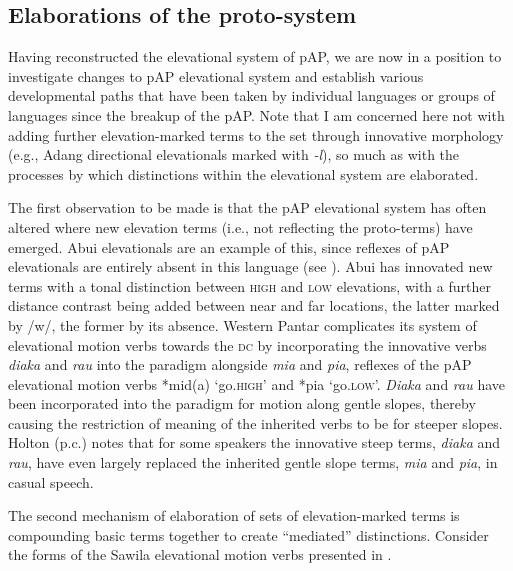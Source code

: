\subsection{Elaborations of the proto-system}\label{sec:7:4.3}
Having reconstructed the elevational system of pAP, we are now in a position to investigate changes to pAP elevational system and establish various developmental paths that have been taken by individual languages or groups of languages since the breakup of the pAP. Note that I am concerned here not with adding further elevation-marked terms to the set through innovative morphology (e.g., Adang directional elevationals marked with \textit{{}-}\textit{l}\textit{{\textepsilon}}), so much as with the processes by which distinctions within the elevational system are elaborated. 

The first observation to be made is that the pAP elevational system has often altered where new elevation terms (i.e., not reflecting the proto-terms) have emerged. Abui elevationals are an example of this, since reflexes of pAP elevationals are entirely absent in this language (see ). Abui has innovated new terms with a tonal distinction between \textsc{high} and \textsc{low} elevations, with a further distance contrast being added between near and far locations, the latter marked by /w/, the former by its absence. Western Pantar complicates its system of elevational motion verbs towards the \textsc{dc} by incorporating the innovative verbs \textit{diaka{\ng}} and \textit{rau{\ng}} into the paradigm alongside \textit{mia} and \textit{pia}, reflexes of the pAP elevational motion verbs *mid(a) `go.\textsc{high'} and *pia `go.\textsc{low'.} \textit{Diaka{\ng}} and \textit{rau{\ng}} have been incorporated into the paradigm for motion along gentle slopes, thereby causing the restriction of meaning of the inherited verbs to be for steeper slopes. Holton (p.c.) notes that for some speakers the innovative steep terms, \textit{diaka{\ng}} and \textit{rau{\ng}}, have even largely replaced the inherited gentle slope terms, \textit{mia} and \textit{pia}, in casual speech. 

The second mechanism of elaboration of sets of elevation-marked terms is compounding basic terms together to create ``mediated'' distinctions. Consider the forms of the Sawila elevational motion verbs presented in . 

